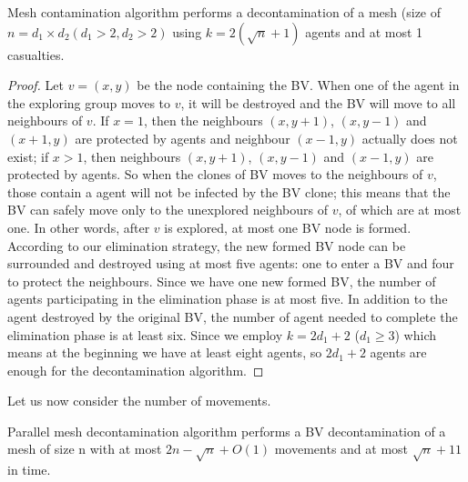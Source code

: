 \begin{theorem}
Mesh contamination algorithm performs a decontamination of a mesh (size of $n=d_1\times d_2(d_1>2,d_2>2)$ using $k=2(\sqrt{n}+1)$ agents and at most 1 casualties.
\end{theorem}
\begin{proof}
Let $v=(x, y)$ be the node containing the BV. When one of the agent in the exploring group moves to $v$, it will be destroyed and the BV will move to all neighbours of $v$. If $x=1$, then the neighbours $(x, y+1)$, $(x, y-1)$ and $(x+1, y)$ are protected by agents and neighbour $(x-1, y)$ actually does not exist; if $x>1$, then neighbours $(x, y+1)$, $(x, y-1)$ and $(x-1, y)$ are protected by agents. So when the clones of BV moves to the neighbours of $v$, those contain a agent will not be infected by the BV clone; this means that the BV can safely move only to the unexplored neighbours of $v$, of which are at most one. In other words, after $v$ is explored, at most one BV node is formed. According to our elimination strategy, the new formed BV node can be surrounded and destroyed using at most five agents: one to enter a BV and four to protect the neighbours. Since we have one new formed BV, the number of agents participating in the elimination phase is at most five. In addition to the agent destroyed by the original BV, the number of agent needed to complete the elimination phase is at least six. Since we employ $k=2d_1+2$ ($d_1\geq 3$) which means at the beginning we have at least eight agents, so $2d_1+2$ agents are enough for the decontamination algorithm.
\end{proof}
Let us now consider the number of movements.
\begin{theorem}
Parallel mesh decontamination algorithm performs a BV decontamination of a mesh of size n with at most $2n-\sqrt{n}+O(1)$ movements and at most $\sqrt{n}+11$ in time.
\end{theorem}
